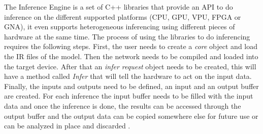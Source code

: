 The Inference Engine is a set of C++ libraries that provide an API to do inference on the different supported platforms (CPU, GPU, VPU, FPGA or GNA), it even supports heterogeneous inferencing using different pieces of hardware at the same time. The process of using the libraries to do inferencing requires the following steps. First, the user needs to create a \textit{core} object and load the IR files of the model. Then the network needs to be compiled and loaded into the target device. After that an \textit{infer request} object needs to be created, this will have a method called \textit{Infer} that will tell the hardware to act on the input data. Finally, the inputs and outputs need to be defined, an input and an output buffer are created. For each inference the input buffer needs to be filled with the input data and once the inference is done, the results can be accessed through the output buffer and the output data can be copied somewhere else for future use or can be analyzed in place and discarded \cite{openvino_toolkit}.
